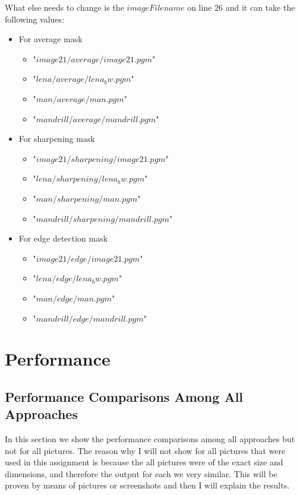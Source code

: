 What else needs to change is the $imageFilename$ on line 26 and it can take the following values:
\begin{itemize}	
	\item For average mask
	\begin{itemize}
		\item "$image21/average/image21.pgm$"
		\item "$lena/average/lena_bw.pgm$"
		\item "$man/average/man.pgm$"
		\item "$mandrill/average/mandrill.pgm$"
	\end{itemize}	
	
	\item For sharpening mask
	\begin{itemize}
		\item "$image21/sharpening/image21.pgm$"
		\item "$lena/sharpening/lena_bw.pgm$"
		\item "$man/sharpening/man.pgm$"
		\item "$mandrill/sharpening/mandrill.pgm$"
	\end{itemize}	
	
	\item For edge detection mask
	\begin{itemize}
		\item "$image21/edge/image21.pgm$"
		\item "$lena/edge/lena_bw.pgm$"
		\item "$man/edge/man.pgm$"
		\item "$mandrill/edge/mandrill.pgm$"
	\end{itemize}

\end{itemize}

\section*{Performance}
\subsection*{Performance Comparisons Among All Approaches}
In this section we show the performance comparisons among all approaches but not for all pictures. The reason why I will not show for all pictures that were used in this assignment is because the all pictures were of the exact size and dimensions, and therefore the output for each we very similar. This will be proven by means of pictures or screenshots and then I will explain the results.

